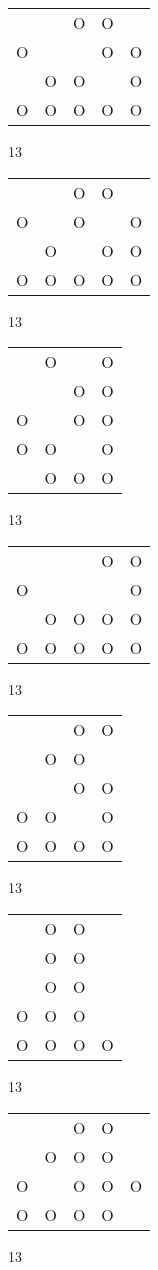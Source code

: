 \begin{tabular}{|m{0.2cm}m{0.2cm}m{0.2cm}m{0.2cm}m{0.2cm}|}\hline
 & &O&O& \\
O& & &O&O\\
 &O&O& &O\\
O&O&O&O&O\\
\hline\end{tabular}13
\begin{tabular}{|m{0.2cm}m{0.2cm}m{0.2cm}m{0.2cm}m{0.2cm}|}\hline
 & &O&O& \\
O& &O& &O\\
 &O& &O&O\\
O&O&O&O&O\\
\hline\end{tabular}13
\begin{tabular}{|m{0.2cm}m{0.2cm}m{0.2cm}m{0.2cm}|}\hline
 &O& &O\\
 & &O&O\\
O& &O&O\\
O&O& &O\\
 &O&O&O\\
\hline\end{tabular}13
\begin{tabular}{|m{0.2cm}m{0.2cm}m{0.2cm}m{0.2cm}m{0.2cm}|}\hline
 & & &O&O\\
O& & & &O\\
 &O&O&O&O\\
O&O&O&O&O\\
\hline\end{tabular}13
\begin{tabular}{|m{0.2cm}m{0.2cm}m{0.2cm}m{0.2cm}|}\hline
 & &O&O\\
 &O&O& \\
 & &O&O\\
O&O& &O\\
O&O&O&O\\
\hline\end{tabular}13
\begin{tabular}{|m{0.2cm}m{0.2cm}m{0.2cm}m{0.2cm}|}\hline
 &O&O& \\
 &O&O& \\
 &O&O& \\
O&O&O& \\
O&O&O&O\\
\hline\end{tabular}13
\begin{tabular}{|m{0.2cm}m{0.2cm}m{0.2cm}m{0.2cm}m{0.2cm}|}\hline
 & &O&O& \\
 &O&O&O& \\
O& &O&O&O\\
O&O&O&O& \\
\hline\end{tabular}13
